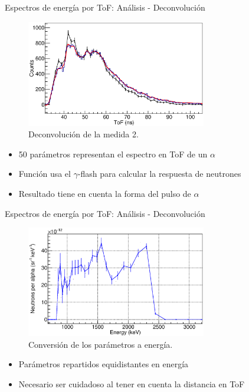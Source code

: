 \documentclass[11pt]{beamer}
\begin{document}
\begin{frame}{Espectros de energía por ToF: Análisis - Deconvolución}
	\begin{figure}[H]
		\centering
		\includegraphics[width=0.70\textwidth]{pulsed_deconvolution_delta.eps}
		\caption{Deconvolución de la medida 2.}
		\label{}
	\end{figure}
	\begin{itemize}
		\item 50 parámetros representan el espectro en ToF de un $\alpha$
		\item Función usa el $\gamma$-flash para calcular la respuesta de neutrones
		\item Resultado tiene en cuenta la forma del pulso de $\alpha$
	\end{itemize}
\end{frame}

\begin{frame}{Espectros de energía por ToF: Análisis - Deconvolución}
	\begin{figure}[H]
		\centering
		\includegraphics[width=0.70\textwidth]{pulsed_deconvolution.eps}
		\caption{Conversión de los parámetros a energía.}
		\label{}
	\end{figure}
	\begin{itemize}
		\item Parámetros repartidos equidistantes en energía
		\item Necesario ser cuidadoso al tener en cuenta la distancia en ToF
	\end{itemize}
\end{frame}
\end{document}
